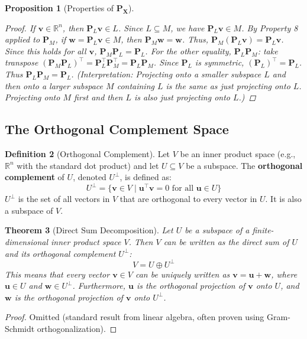 \documentclass[11pt, a4paper]{article}
\newtheorem{theorem}{Theorem}[section]
\newtheorem{proposition}[theorem]{Proposition}
\theoremstyle{definition}
\newtheorem{definition}[theorem]{Definition}
\theoremstyle{remark}
\newcommand{\RR}{\mathbb{R}}             %
\newcommand{\mat}[1]{\mathbf{#1}}       %
\newcommand{\vect}[1]{\bm{#1}}          %
\newcommand{\transpose}{^{\top}}        %
\begin{document}
\begin{proposition}[Properties of $\mat{P}_{\mat{X}}$]
\begin{enumerate}
        \begin{proof} %
        If $\vect{v} \in \RR^n$, then $\mat{P}_L \vect{v} \in L$. Since $L \subseteq M$, we have $\mat{P}_L \vect{v} \in M$. By Property 8 applied to $\mat{P}_M$, if $\vect{w} = \mat{P}_L \vect{v} \in M$, then $\mat{P}_M \vect{w} = \vect{w}$. Thus, $\mat{P}_M (\mat{P}_L \vect{v}) = \mat{P}_L \vect{v}$. Since this holds for all $\vect{v}$, $\mat{P}_M \mat{P}_L = \mat{P}_L$.
        For the other equality, $\mat{P}_L \mat{P}_M$: take transpose $\left(\mat{P}_M \mat{P}_L\right)\transpose = \mat{P}_L\transpose \mat{P}_M\transpose = \mat{P}_L \mat{P}_M$. Since $\mat{P}_L$ is symmetric, $(\mat{P}_L)\transpose = \mat{P}_L$. Thus $\mat{P}_L \mat{P}_M = \mat{P}_L$.
        (Interpretation: Projecting onto a smaller subspace $L$ and then onto a larger subspace $M$ containing $L$ is the same as just projecting onto $L$. Projecting onto $M$ first and then $L$ is also just projecting onto $L$.)
        \end{proof} %
\end{enumerate}
\end{proposition}

\subsection{The Orthogonal Complement Space}

\begin{definition}[Orthogonal Complement]
Let $V$ be an inner product space (e.g., $\RR^n$ with the standard dot product) and let $U \subseteq V$ be a subspace. The \textbf{orthogonal complement} of $U$, denoted $U^{\perp}$, is defined as:
\[ U^{\perp} = \{ \vect{v} \in V \mid \vect{u}\transpose \vect{v} = 0 \text{ for all } \vect{u} \in U \} \]
$U^{\perp}$ is the set of all vectors in $V$ that are orthogonal to every vector in $U$. It is also a subspace of $V$.
\end{definition}

\begin{theorem}[Direct Sum Decomposition]
Let $U$ be a subspace of a finite-dimensional inner product space $V$. Then $V$ can be written as the direct sum of $U$ and its orthogonal complement $U^{\perp}$:
\[ V = U \oplus U^{\perp} \]
This means that every vector $\vect{v} \in V$ can be uniquely written as $\vect{v} = \vect{u} + \vect{w}$, where $\vect{u} \in U$ and $\vect{w} \in U^{\perp}$. Furthermore, $\vect{u}$ is the orthogonal projection of $\vect{v}$ onto $U$, and $\vect{w}$ is the orthogonal projection of $\vect{v}$ onto $U^{\perp}$.
\end{theorem}
\begin{proof}
Omitted (standard result from linear algebra, often proven using Gram-Schmidt orthogonalization).
\end{proof}
\end{document}
